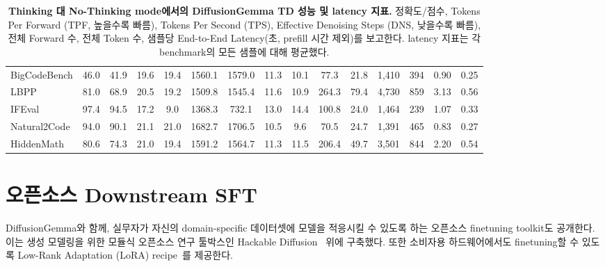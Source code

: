 \documentclass[11pt, a4paper, logo, copyright, gdm]{google}
\begin{document}
\begin{landscape}
\begin{table}[t!]
\begin{tabular}{l|cc|cc|cc|cc|cc|cc|cc}
BigCodeBench & 46.0 & 41.9 & 19.6 & 19.4 & 1560.1 & 1579.0 & 11.3 & 10.1 & 77.3 & 21.8 & 1,410 & 394 & 0.90 & 0.25 \\
LBPP & 81.0 & 68.9 & 20.5 & 19.2 & 1509.8 & 1545.4 & 11.6 & 10.9 & 264.3 & 79.4 & 4,730 & 859 & 3.13 & 0.56 \\
IFEval & 97.4 & 94.5 & 17.2 & 9.0 & 1368.3 & 732.1 & 13.0 & 14.4 & 100.8 & 24.0 & 1,464 & 239 & 1.07 & 0.33 \\
Natural2Code & 94.0 & 90.1 & 21.1 & 21.0 & 1682.7 & 1706.5 & 10.5 & 9.6 & 70.5 & 24.7 & 1,391 & 465 & 0.83 & 0.27 \\
HiddenMath & 80.6 & 74.3 & 21.0 & 19.4 & 1591.2 & 1564.7 & 11.3 & 11.5 & 206.4 & 49.7 & 3,501 & 844 & 2.20 & 0.54 \\
\bottomrule
\end{tabular}
\caption{\textbf{Thinking 대 No-Thinking mode에서의 DiffusionGemma TD 성능 및 latency 지표.} 정확도/점수, Tokens Per Forward (TPF, 높을수록 빠름), Tokens Per Second (TPS), Effective Denoising Steps (DNS, 낮을수록 빠름), 전체 Forward 수, 전체 Token 수, 샘플당 End-to-End Latency(초, prefill 시간 제외)를 보고한다. latency 지표는 각 benchmark의 모든 샘플에 대해 평균했다.}
\label{tab:dg_td_latency}
\end{table}

\end{landscape}


\section{오픈소스 Downstream SFT}\label{sec:downstream_sft}

DiffusionGemma와 함께, 실무자가 자신의 domain-specific 데이터셋에 모델을 적응시킬 수 있도록 하는 오픈소스 finetuning toolkit도 공개한다. 이는 생성 모델링을 위한 모듈식 오픈소스 연구 툴박스인 Hackable Diffusion~\citep{hackable_diffusion2026github} 위에 구축했다.
또한 소비자용 하드웨어에서도 finetuning할 수 있도록 Low-Rank Adaptation (LoRA) recipe~\citep{hu2021loralowrankadaptationlarge}를 제공한다.
\end{document}

